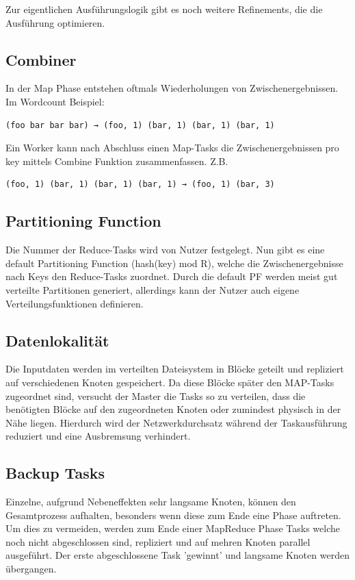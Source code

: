 Zur eigentlichen Ausführungslogik gibt es noch weitere Refinements, die die Ausführung optimieren.
\subsection*{Combiner}
In der Map Phase entstehen oftmals Wiederholungen von Zwischenergebnissen.
Im Wordcount Beispiel:
\begin{verbatim}
(foo bar bar bar) → (foo, 1) (bar, 1) (bar, 1) (bar, 1)
\end{verbatim}

Ein Worker kann nach Abschluss einen Map-Tasks die Zwischenergebnissen pro key mittels Combine Funktion zusammenfassen.
Z.B.
\begin{verbatim}
(foo, 1) (bar, 1) (bar, 1) (bar, 1) → (foo, 1) (bar, 3)
\end{verbatim}


\subsection*{Partitioning Function}

Die Nummer der Reduce-Tasks wird von Nutzer festgelegt.
Nun gibt es eine default Partitioning Function (hash(key) mod R),
welche die Zwischenergebnisse nach Keys den Reduce-Tasks zuordnet.
Durch die default PF werden meist gut verteilte Partitionen generiert,
allerdings kann der Nutzer auch eigene Verteilungsfunktionen definieren.

\subsection*{Datenlokalität}

Die Inputdaten werden im verteilten Dateisystem in Blöcke geteilt und repliziert auf verschiedenen Knoten gespeichert.
Da diese Blöcke später den MAP-Tasks zugeordnet sind, versucht der Master die Tasks so zu verteilen, dass die benötigten Blöcke auf den zugeordneten Knoten oder zumindest physisch in der Nähe liegen.
Hierdurch wird der Netzwerkdurchsatz während der Taskausführung reduziert und eine Ausbremsung verhindert.


\subsection*{Backup Tasks}

Einzelne, aufgrund Nebeneffekten sehr langsame Knoten, können den Gesamtprozess aufhalten, besonders wenn diese zum Ende eine Phase auftreten.
Um dies zu vermeiden, werden zum Ende einer MapReduce Phase Tasks welche noch nicht abgeschlossen sind, repliziert und auf mehren Knoten parallel ausgeführt.
Der erste abgeschlossene Task 'gewinnt' und langsame Knoten werden übergangen.


